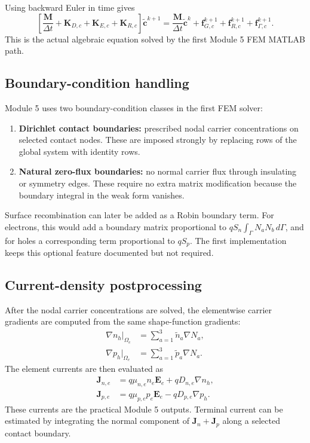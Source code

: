 \documentclass[11pt]{article}
\begin{document}
Using backward Euler in time gives
\begin{equation}
    \left[\frac{\mathbf{M}}{\Delta t}
    +\mathbf{K}_{D,c}+\mathbf{K}_{E,c}+\mathbf{K}_{R,c}\right]
    \tilde{\mathbf{c}}^{k+1}
    =\frac{\mathbf{M}}{\Delta t}\tilde{\mathbf{c}}^{k}
    +\mathbf{f}_{G,c}^{k+1}+\mathbf{f}_{R,c}^{k+1}+\mathbf{f}_{\Gamma,c}^{k+1}.
    \label{eq:m5_backward_euler}
\end{equation}
This is the actual algebraic equation solved by the first Module 5 FEM MATLAB path.

\subsection{Boundary-condition handling}

Module 5 uses two boundary-condition classes in the first FEM solver:
\begin{enumerate}[leftmargin=1.6em]
    \item \textbf{Dirichlet contact boundaries:} prescribed nodal carrier concentrations on selected contact nodes. These are imposed strongly by replacing rows of the global system with identity rows.
    \item \textbf{Natural zero-flux boundaries:} no normal carrier flux through insulating or symmetry edges. These require no extra matrix modification because the boundary integral in the weak form vanishes.
\end{enumerate}
Surface recombination can later be added as a Robin boundary term. For electrons, this would add a boundary matrix proportional to \(qS_n\int_{\Gamma}N_aN_b\,d\Gamma\), and for holes a corresponding term proportional to \(qS_p\). The first implementation keeps this optional feature documented but not required.

\subsection{Current-density postprocessing}

After the nodal carrier concentrations are solved, the elementwise carrier gradients are computed from the same shape-function gradients:
\begin{align}
    \nabla n_h\big|_{\Omega_e} &= \sum_{a=1}^{3}\tilde{n}_a\nabla N_a, \\
    \nabla p_h\big|_{\Omega_e} &= \sum_{a=1}^{3}\tilde{p}_a\nabla N_a.
\end{align}
The element currents are then evaluated as
\begin{align}
    \mathbf{J}_{n,e} &= q\mu_{n,e}n_e\mathbf{E}_e+qD_{n,e}\nabla n_h, \\
    \mathbf{J}_{p,e} &= q\mu_{p,e}p_e\mathbf{E}_e-qD_{p,e}\nabla p_h.
\end{align}
These currents are the practical Module 5 outputs. Terminal current can be estimated by integrating the normal component of \(\mathbf{J}_n+\mathbf{J}_p\) along a selected contact boundary.
\end{document}
